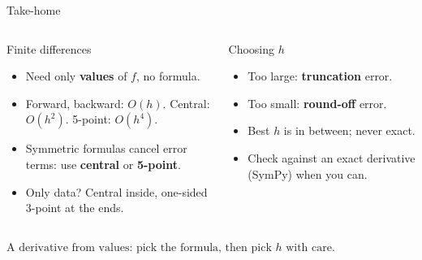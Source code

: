 \documentclass[aspectratio=169]{beamer}
\newcommand{\cbox}[2]{\colorbox{#1}{\ensuremath{\displaystyle #2}}}
\begin{document}
\begin{frame}{Take-home}
\begin{columns}[T]
\begin{column}{0.48\textwidth}
\begin{exampleblock}{Finite differences}
\small
\begin{itemize}
\item Need only \textbf{values} of $f$, no formula.
\item Forward, backward: $O(h)$. Central: $O(h^2)$. 5-point: $O(h^4)$.
\item Symmetric formulas cancel error terms: use \textbf{central} or \textbf{5-point}.
\item Only data? Central inside, one-sided 3-point at the ends.
\end{itemize}
\end{exampleblock}
\end{column}
\begin{column}{0.48\textwidth}
\begin{alertblock}{Choosing $h$}
\small
\begin{itemize}
\item Too large: \textbf{truncation} error.
\item Too small: \textbf{round-off} error.
\item Best $h$ is in between; never exact.
\item Check against an exact derivative (SymPy) when you can.
\end{itemize}
\end{alertblock}
\end{column}
\end{columns}
\vspace{0.8em}
\centering
\cbox{accent!12}{\text{A derivative from values: pick the formula, then pick } h \text{ with care.}}
\end{frame}
\end{document}
